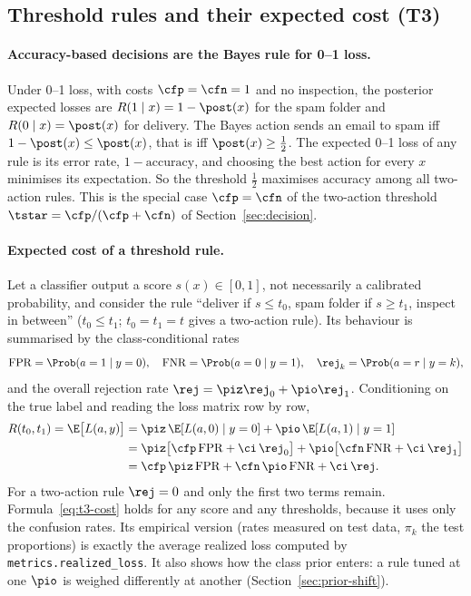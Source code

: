 \subsection{Threshold rules and their expected cost (T3)}
\label{sec:t3-cost}

\paragraph{Accuracy-based decisions are the Bayes rule for 0--1 loss.}
Under 0--1 loss, with costs $\cfp=\cfn=1$ and no inspection, the posterior expected losses are
$R(1\mid x)=1-\post(x)$ for the spam folder and $R(0\mid x)=\post(x)$ for delivery. The Bayes
action sends an email to spam iff $1-\post(x)\le\post(x)$, that is iff $\post(x)\ge\tfrac12$. The
expected 0--1 loss of any rule is its error rate, $1-\text{accuracy}$, and choosing the
best action for every $x$ minimises its expectation. So the threshold $\tfrac12$
maximises accuracy among all two-action rules. This is the special case $\cfp=\cfn$ of the
two-action threshold $\tstar=\cfp/(\cfp+\cfn)$ of Section~\ref{sec:decision}.

\paragraph{Expected cost of a threshold rule.}
Let a classifier output a score $s(x)\in[0,1]$, not necessarily a calibrated probability, and
consider the rule ``deliver if $s\le t_0$, spam folder if $s\ge t_1$, inspect in between''
($t_0\le t_1$; $t_0=t_1=t$ gives a two-action rule). Its behaviour is summarised by the class-conditional rates
\[
  \mathrm{FPR}=\Prob(a=1\mid y=0), \quad \mathrm{FNR}=\Prob(a=0\mid y=1), \quad
  \rej_k=\Prob(a=r\mid y=k),
\]
and the overall rejection rate $\rej=\piz\rej_0+\pio\rej_1$. Conditioning on the true label and
reading the loss matrix row by row,
\begin{align}
  R(t_0,t_1) = \E\big[L(a,y)\big]
  &= \piz\,\E[L(a,0)\mid y=0] + \pio\,\E[L(a,1)\mid y=1] \notag\\
  &= \piz\big[\cfp\,\mathrm{FPR} + \ci\,\rej_0\big] + \pio\big[\cfn\,\mathrm{FNR} + \ci\,\rej_1\big] \notag\\
  &= \cfp\,\piz\,\mathrm{FPR} + \cfn\,\pio\,\mathrm{FNR} + \ci\,\rej .
  \label{eq:t3-cost}
\end{align}
For a two-action rule $\rej=0$ and only the first two terms remain.
Formula~\eqref{eq:t3-cost} holds for any score and any thresholds, because it uses only the confusion
rates. Its empirical version (rates measured on test data, $\pi_k$ the test proportions) is exactly
the average realized loss computed by \texttt{metrics.realized\_loss}. It also shows how the class
prior enters: a rule tuned at one $\pio$ is weighed differently at another (Section~\ref{sec:prior-shift}).

